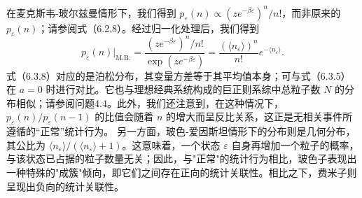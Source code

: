 在麦克斯韦-玻尔兹曼情形下，我们得到 \(p_{\varepsilon}(n) \propto (ze^{-\beta\varepsilon})^{n}/n!\)，而非原来的 \(p_{\varepsilon}(n)\)；请参阅式（6.2.8）。经过归一化处理后，我们得到
\begin{equation}\tag{6.3.8}\label{eq:6.3.8}
p _ { \varepsilon } ( n ) | _ { \mathrm { M . B . } } = \frac { \left( z e ^{- \beta \varepsilon} \right) ^{n} / n ! } { \exp \left( z e ^{- \beta \varepsilon} \right) } = \frac { ( \langle n _ { \varepsilon } \rangle ) ^{n} } { n ! } e ^{- \langle n _ { \varepsilon} \rangle } .
\end{equation}
式（6.3.8）对应的是泊松分布，其变量方差等于其平均值本身；可与式（6.3.5）在 \(a=0\) 时进行对比。它也与理想经典系统构成的巨正则系综中总粒子数 \(N\) 的分布相似；请参阅问题4.4。此外，我们还注意到，在这种情况下，\(p_{\varepsilon}(n)/p_{\varepsilon}(n-1)\) 的比值会随着 \(n\) 的增大而呈反比关系，这正是无相关事件所遵循的“正常”统计行为。
另一方面，玻色-爱因斯坦情形下的分布则是几何分布，其公比为 \(\langle n_{\varepsilon}\rangle/(\langle n_{\varepsilon}\rangle+1)\)。这意味着，一个状态 \(\varepsilon\) 自身再增加一个粒子的概率，与该状态已占据的粒子数量无关；因此，与"正常"的统计行为相比，玻色子表现出一种特殊的"成簇"倾向，即它们之间存在正向的统计关联性。相比之下，费米子则呈现出负向的统计关联性。
